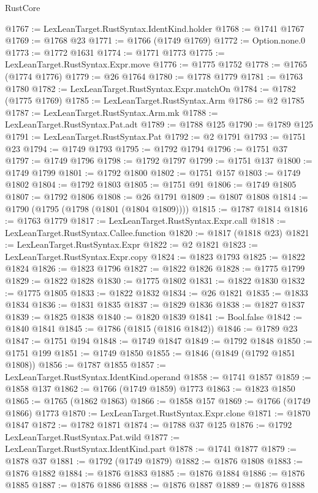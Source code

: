 \begin{lexlean}{RustCore}
\begin{coremodule}
@1767 := LexLeanTarget.RustSyntax.IdentKind.holder
@1768 := @1741 @1767
@1769 := @1768 @23
@1771 := @1766 (@1749 @1769)
@1772 := Option.none.{0}
@1773 := @1772 @1631
@1774 := @1771 @1773
@1775 := LexLeanTarget.RustSyntax.Expr.move
@1776 := @1775 @1752
@1778 := @1765 (@1774 @1776)
@1779 := @26 @1764
@1780 := @1778 @1779
@1781 := @1763 @1780
@1782 := LexLeanTarget.RustSyntax.Expr.matchOn
@1784 := @1782 (@1775 @1769)
@1785 := LexLeanTarget.RustSyntax.Arm
@1786 := @2 @1785
@1787 := LexLeanTarget.RustSyntax.Arm.mk
@1788 := LexLeanTarget.RustSyntax.Pat.adt
@1789 := @1788 @125
@1790 := @1789 @125
@1791 := LexLeanTarget.RustSyntax.Pat
@1792 := @2 @1791
@1793 := @1751 @23
@1794 := @1749 @1793
@1795 := @1792 @1794
@1796 := @1751 @37
@1797 := @1749 @1796
@1798 := @1792 @1797
@1799 := @1751 @137
@1800 := @1749 @1799
@1801 := @1792 @1800
@1802 := @1751 @157
@1803 := @1749 @1802
@1804 := @1792 @1803
@1805 := @1751 @91
@1806 := @1749 @1805
@1807 := @1792 @1806
@1808 := @26 @1791
@1809 := @1807 @1808
@1814 := @1790 (@1795 (@1798 (@1801 (@1804 @1809))))
@1815 := @1787 @1814
@1816 := @1763 @1779
@1817 := LexLeanTarget.RustSyntax.Expr.call
@1818 := LexLeanTarget.RustSyntax.Callee.function
@1820 := @1817 (@1818 @23)
@1821 := LexLeanTarget.RustSyntax.Expr
@1822 := @2 @1821
@1823 := LexLeanTarget.RustSyntax.Expr.copy
@1824 := @1823 @1793
@1825 := @1822 @1824
@1826 := @1823 @1796
@1827 := @1822 @1826
@1828 := @1775 @1799
@1829 := @1822 @1828
@1830 := @1775 @1802
@1831 := @1822 @1830
@1832 := @1775 @1805
@1833 := @1822 @1832
@1834 := @26 @1821
@1835 := @1833 @1834
@1836 := @1831 @1835
@1837 := @1829 @1836
@1838 := @1827 @1837
@1839 := @1825 @1838
@1840 := @1820 @1839
@1841 := Bool.false
@1842 := @1840 @1841
@1845 := @1786 (@1815 (@1816 @1842))
@1846 := @1789 @23
@1847 := @1751 @194
@1848 := @1749 @1847
@1849 := @1792 @1848
@1850 := @1751 @199
@1851 := @1749 @1850
@1855 := @1846 (@1849 (@1792 @1851 @1808))
@1856 := @1787 @1855
@1857 := LexLeanTarget.RustSyntax.IdentKind.operand
@1858 := @1741 @1857
@1859 := @1858 @137
@1862 := @1766 (@1749 @1859) @1773
@1863 := @1823 @1850
@1865 := @1765 (@1862 @1863)
@1866 := @1858 @157
@1869 := @1766 (@1749 @1866) @1773
@1870 := LexLeanTarget.RustSyntax.Expr.clone
@1871 := @1870 @1847
@1872 := @1782 @1871
@1874 := @1788 @37 @125
@1876 := @1792 LexLeanTarget.RustSyntax.Pat.wild
@1877 := LexLeanTarget.RustSyntax.IdentKind.part
@1878 := @1741 @1877
@1879 := @1878 @37
@1881 := @1792 (@1749 @1879)
@1882 := @1876 @1808
@1883 := @1876 @1882
@1884 := @1876 @1883
@1885 := @1876 @1884
@1886 := @1876 @1885
@1887 := @1876 @1886
@1888 := @1876 @1887
@1889 := @1876 @1888

\end{coremodule}
\end{lexlean}
